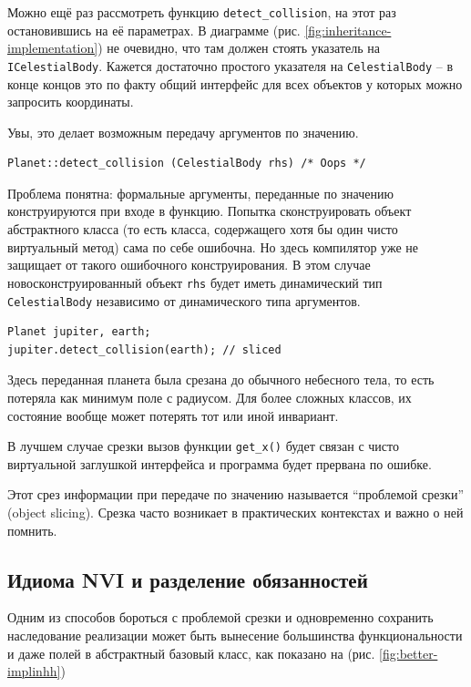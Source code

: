 \documentclass[a4paper,12pt,oneside]{book}
\begin{document}
Можно ещё раз рассмотреть функцию \lstinline!detect_collision!, на этот раз остановившись на её параметрах. В диаграмме (рис. \ref{fig:inheritance-implementation}) не очевидно, что там должен стоять указатель на \lstinline!ICelestialBody!. Кажется достаточно простого указателя на \lstinline!CelestialBody! -- в конце концов это по факту общий интерфейс для всех объектов у которых можно запросить координаты.

Увы, это делает возможным передачу аргументов по значению.

\begin{lstlisting}
Planet::detect_collision (CelestialBody rhs) /* Oops */
\end{lstlisting}

Проблема понятна: формальные аргументы, переданные по значению конструируются при входе в функцию. Попытка сконструировать объект абстрактного класса (то есть класса, содержащего хотя бы один чисто виртуальный метод) сама по себе ошибочна. Но здесь компилятор уже не защищает от такого ошибочного конструирования. В этом случае новосконструированный объект \lstinline!rhs! будет иметь динамический тип \lstinline!CelestialBody! независимо от динамического типа аргументов. 

\begin{lstlisting}
Planet jupiter, earth;
jupiter.detect_collision(earth); // sliced
\end{lstlisting}

Здесь переданная планета была срезана до обычного небесного тела, то есть потеряла как минимум поле с радиусом. Для более сложных классов, их состояние вообще может потерять тот или иной инвариант.

В лучшем случае срезки вызов функции \lstinline!get_x()! будет связан с чисто виртуальной заглушкой интерфейса и программа будет прервана по ошибке. 

Этот срез информации при передаче по значению называется ``проблемой срезки'' (object slicing). Срезка часто возникает в практических контекстах и важно о ней помнить.

\subsection{Идиома NVI и разделение обязанностей}\label{NVI}

Одним из способов бороться с проблемой срезки и одновременно сохранить наследование реализации может быть вынесение большинства функциональности и даже полей в абстрактный базовый класс, как показано на (рис. \ref{fig:better-implinhh})
\end{document}
